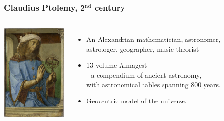 \documentclass[aspectratio=169,xcolor=pdftex,dvipsnames]{beamer} %
\begin{document}
\begin{frame}
\frametitle{Claudius Ptolemy, 2$^{\text{nd}}$ century}

\begin{columns}

      \includegraphics[width=50mm]{ptolemy.jpg}
\vspace{-10mm}
\begin{itemize}
\item
An Alexandrian mathematician, astronomer, astrologer, geographer, music theorist
\item
13-volume Almagest\\
- a compendium of ancient astronomy,\\ with astronomical tables spanning 800 years.
\item
Geocentric model of the universe. 
\end{itemize}

\end{columns} 

\end{frame}

\end{document}
